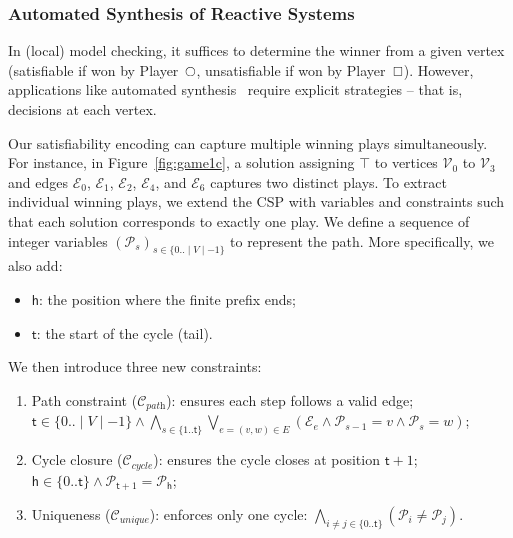 \documentclass{article}
\begin{document}
\subsubsection{Automated Synthesis of Reactive Systems}

In (local) model checking, it suffices to determine the winner from a given vertex (satisfiable if won by Player~$\even$, unsatisfiable if won by Player~$\odd$). However, applications like automated synthesis~\cite{Bruyere:2022,Finkbeiner:2018,Luttenberger:2020} require explicit strategies -- that is, decisions at each vertex.

Our satisfiability encoding can capture multiple winning plays simultaneously. For instance, in Figure~\ref{fig:game1c}, a solution assigning $\top$ to vertices $\mathcal{V}_0$ to $\mathcal{V}_3$ and edges $\mathcal{E}_0$, $\mathcal{E}_1$, $\mathcal{E}_2$, $\mathcal{E}_4$, and $\mathcal{E}_6$ captures two distinct plays.
%
To extract individual winning plays, we extend the CSP with variables and constraints such that each solution corresponds to exactly one play. We define a sequence of integer variables $(\mathcal{P}_s)_{s \in \{0..\mid V \mid - 1\}}$ to represent the path. More specifically, we also add:
\begin{itemize}
\item $\mathsf{h}$: the position where the finite prefix ends;

\item $\mathsf{t}$: the start of the cycle (tail).
\end{itemize} 

\noindent 
We then introduce three new constraints:
\begin{enumerate}
\item Path constraint ($\mathcal{C}_{\textit{path}}$): ensures each step follows a valid edge;
$\mathsf{t} \in \{0..\mid V \mid -1\} \wedge \bigwedge_{s \in \{1..\mathsf{t}\}} \bigvee_{e=(v,w) \in E} (\mathcal{E}_e \wedge \mathcal{P}_{s-1} = v \wedge \mathcal{P}_s = w)$;

\item Cycle closure ($\mathcal{C}_{\textit{cycle}}$): ensures the cycle closes at position $\mathsf{t} + 1$;
$\mathsf{h} \in \{0..\mathsf{t}\} \wedge \mathcal{P}_{\mathsf{t}+1} = \mathcal{P}_\mathsf{h}$;

\item Uniqueness ($\mathcal{C}_{\textit{unique}}$): enforces only one cycle: $\bigwedge_{i \neq j \in \{0..\mathsf{t}\}} (\mathcal{P}_i \neq \mathcal{P}_j)$.
\end{enumerate} 
\end{document}
